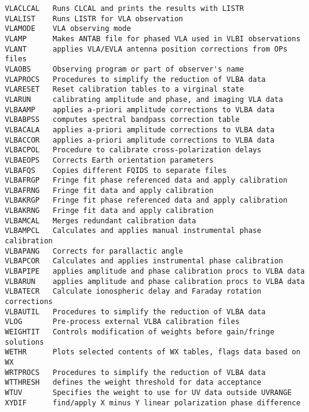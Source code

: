 \begin{verbatim}
VLACLCAL   Runs CLCAL and prints the results with LISTR
VLALIST    Runs LISTR for VLA observation
VLAMODE    VLA observing mode
VLAMP      Makes ANTAB file for phased VLA used in VLBI observations
VLANT      applies VLA/EVLA antenna position corrections from OPs files
VLAOBS     Observing program or part of observer's name
VLAPROCS   Procedures to simplify the reduction of VLBA data
VLARESET   Reset calibration tables to a virginal state
VLARUN     calibrating amplitude and phase, and imaging VLA data
VLBAAMP    applies a-priori amplitude corrections to VLBA data
VLBABPSS   computes spectral bandpass correction table
VLBACALA   applies a-priori amplitude corrections to VLBA data
VLBACCOR   applies a-priori amplitude corrections to VLBA data
VLBACPOL   Procedure to calibrate cross-polarization delays
VLBAEOPS   Corrects Earth orientation parameters
VLBAFQS    Copies different FQIDS to separate files
VLBAFRGP   Fringe fit phase referenced data and apply calibration
VLBAFRNG   Fringe fit data and apply calibration
VLBAKRGP   Fringe fit phase referenced data and apply calibration
VLBAKRNG   Fringe fit data and apply calibration
VLBAMCAL   Merges redundant calibration data
VLBAMPCL   Calculates and applies manual instrumental phase calibration
VLBAPANG   Corrects for parallactic angle
VLBAPCOR   Calculates and applies instrumental phase calibration
VLBAPIPE   applies amplitude and phase calibration procs to VLBA data
VLBARUN    applies amplitude and phase calibration procs to VLBA data
VLBATECR   Calculate ionospheric delay and Faraday rotation corrections
VLBAUTIL   Procedures to simplify the reduction of VLBA data
VLOG       Pre-process external VLBA calibration files
WEIGHTIT   Controls modification of weights before gain/fringe solutions
WETHR      Plots selected contents of WX tables, flags data based on WX
WRTPROCS   Procedures to simplify the reduction of VLBA data
WTTHRESH   defines the weight threshold for data acceptance
WTUV       Specifies the weight to use for UV data outside UVRANGE
XYDIF      find/apply X minus Y linear polarization phase difference
\end{verbatim}\eve


